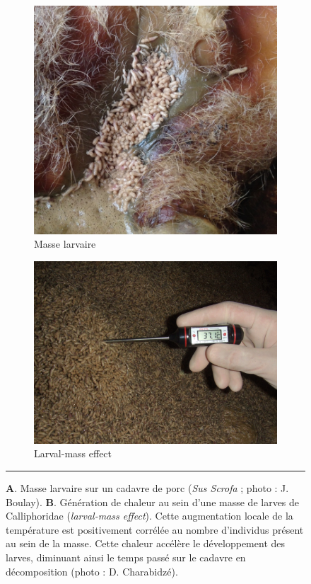 \begin{figure}[ht]
\centering
		\begin{subfigure}{0.4\textwidth}
			\includegraphics[width=\linewidth]{Figures/mass2.png}
			\caption{Masse larvaire}
				\label{sub:mass2}
		\end{subfigure}
		\begin{subfigure}{0.5\textwidth}
			\includegraphics[width= \textwidth]{Figures/larvalmass.JPG}
			\caption[Larval mass]{Larval-mass effect}
		\end{subfigure}
    \rule{35em}{0.5pt}
    \caption{\textbf{A}. Masse larvaire sur un cadavre de porc (\textit{Sus Scrofa} ; photo : J. Boulay). \textbf{B}. Génération de chaleur au sein d’une masse de larves de Calliphoridae (\textit{larval-mass effect}). Cette augmentation locale de la température est positivement corrélée au nombre d’individus présent au sein de la
masse. Cette chaleur accélère le développement des larves, diminuant ainsi le temps passé sur le cadavre en décomposition (photo : D. Charabidzé).}
    \label{fig:mass}
\end{figure}

